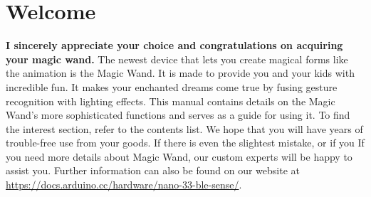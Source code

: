 %
%


\chapter{Welcome}

\textbf{{\Large I sincerely appreciate your choice and congratulations on acquiring your magic wand.}}
The newest device that lets you create magical forms like the animation is the Magic Wand. It is made to provide you and your kids with incredible fun. It makes your enchanted dreams come true by fusing gesture recognition with lighting effects.
This manual contains details on the Magic Wand's more sophisticated functions and serves as a guide for using it. To find the interest section, refer to the contents list.
We hope that you will have years of trouble-free use from your goods. If there is even the slightest mistake, or if you
If you need more details about Magic Wand, our custom experts will be happy to assist you.
 Further information can also be found on our website at \url{https://docs.arduino.cc/hardware/nano-33-ble-sense/}.

\bigskip

\textbf{}